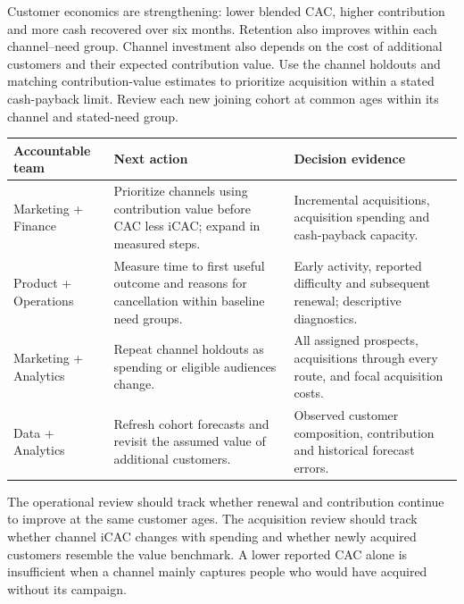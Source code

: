 \documentclass[10pt]{article}
\begin{document}
\NewPage
{}
Customer economics are strengthening: lower blended CAC, higher contribution and more cash recovered over six months. Retention also improves within each channel--need group. Channel investment also depends on the cost of additional customers and their expected contribution value.
Use the channel holdouts and matching contribution-value estimates to prioritize acquisition within a stated cash-payback limit. Review each new joining cohort at common ages within its channel and stated-need group.
\par\begin{tabularx}{\linewidth}{@{}p{.18\linewidth}YY@{}}\toprule
\textbf{Accountable team} & \textbf{Next action} & \textbf{Decision evidence}\\\midrule
Marketing + Finance & Prioritize channels using contribution value before CAC less iCAC; expand in measured steps. & Incremental acquisitions, acquisition spending and cash-payback capacity.\\
Product + Operations & Measure time to first useful outcome and reasons for cancellation within baseline need groups. & Early activity, reported difficulty and subsequent renewal; descriptive diagnostics.\\
Marketing + Analytics & Repeat channel holdouts as spending or eligible audiences change. & All assigned prospects, acquisitions through every route, and focal acquisition costs.\\
Data + Analytics & Refresh cohort forecasts and revisit the assumed value of additional customers. & Observed customer composition, contribution and historical forecast errors.\\
\bottomrule\end{tabularx}\par
{}
The operational review should track whether renewal and contribution continue to improve at the same customer ages. The acquisition review should track whether channel iCAC changes with spending and whether newly acquired customers resemble the value benchmark. A lower reported CAC alone is insufficient when a channel mainly captures people who would have acquired without its campaign.
\end{document}
